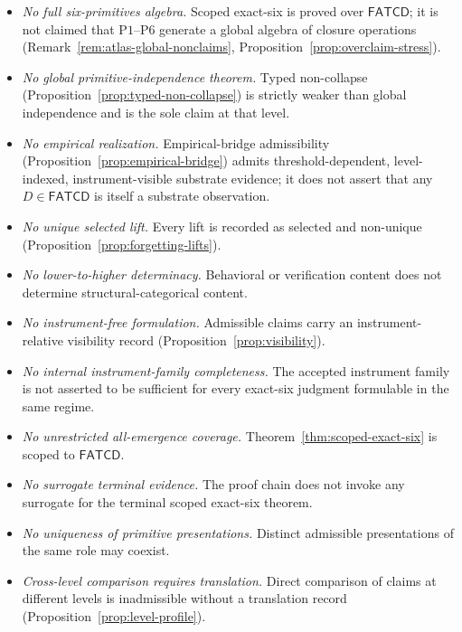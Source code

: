 \documentclass[11pt]{article}
\theoremstyle{definition}
\newcommand{\FATCD}{\ensuremath{\mathsf{FATCD}}}
\newcommand{\Pone}{\ensuremath{\mathrm{P1}}}
\newcommand{\Psix}{\ensuremath{\mathrm{P6}}}
\begin{document}
\begin{itemize}[topsep=2pt,itemsep=1pt]
  \item \emph{No full six-primitives algebra.} Scoped exact-six is
    proved over \FATCD{}; it is not claimed that \Pone{}--\Psix{}
    generate a global algebra of closure operations
    (Remark~\ref{rem:atlas-global-nonclaims},
    Proposition~\ref{prop:overclaim-stress}).
  \item \emph{No global primitive-independence theorem.} Typed
    non-collapse (Proposition~\ref{prop:typed-non-collapse}) is
    strictly weaker than global independence and is the sole claim at
    that level.
  \item \emph{No empirical realization.} Empirical-bridge admissibility
    (Proposition~\ref{prop:empirical-bridge}) admits
    threshold-dependent, level-indexed, instrument-visible substrate
    evidence; it does not assert that any \(D \in \FATCD{}\) is itself
    a substrate observation.
  \item \emph{No unique selected lift.} Every lift is recorded as
    selected and non-unique
    (Proposition~\ref{prop:forgetting-lifts}).
  \item \emph{No lower-to-higher determinacy.} Behavioral or
    verification content does not determine structural-categorical
    content.
  \item \emph{No instrument-free formulation.} Admissible claims carry
    an instrument-relative visibility record
    (Proposition~\ref{prop:visibility}).
  \item \emph{No internal instrument-family completeness.} The
    accepted instrument family is not asserted to be sufficient for
    every exact-six judgment formulable in the same regime.
  \item \emph{No unrestricted all-emergence coverage.}
    Theorem~\ref{thm:scoped-exact-six} is scoped to \FATCD{}.
  \item \emph{No surrogate terminal evidence.} The proof chain does
    not invoke any surrogate for the terminal scoped exact-six
    theorem.
  \item \emph{No uniqueness of primitive presentations.} Distinct
    admissible presentations of the same role may coexist.
  \item \emph{Cross-level comparison requires translation.} Direct
    comparison of claims at different levels is inadmissible without a
    translation record (Proposition~\ref{prop:level-profile}).
\end{itemize}
\end{document}
